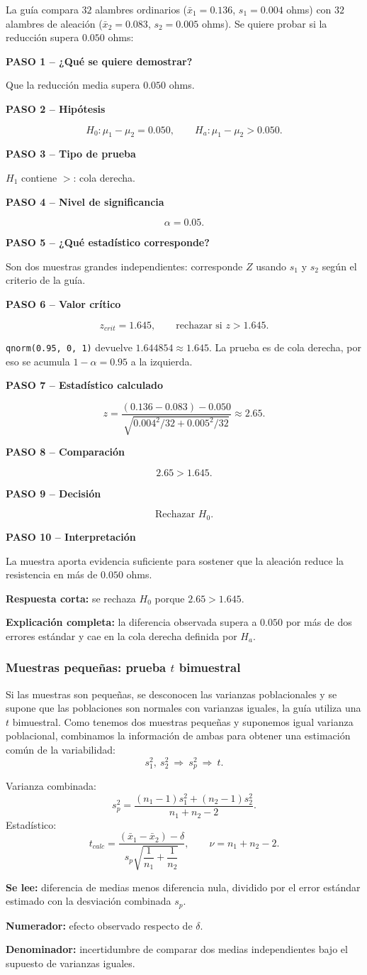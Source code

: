 \documentclass[11pt,a4paper]{article}
\newcommand{\paso}[2]{\par\medskip\noindent\textbf{PASO #1 -- #2}\par}
\begin{document}
La guía compara $32$ alambres ordinarios ($\bar{x}_1=0.136$, $s_1=0.004$ ohms) con $32$ alambres de aleación ($\bar{x}_2=0.083$, $s_2=0.005$ ohms). Se quiere probar si la reducción supera $0.050$ ohms:
\paso{1}{¿Qué se quiere demostrar?} Que la reducción media supera $0.050$ ohms.
\paso{2}{Hipótesis}
\[
H_0:\mu_1-\mu_2=0.050,
\qquad
H_a:\mu_1-\mu_2>0.050.
\]
\paso{3}{Tipo de prueba} $H_1$ contiene $>$: cola derecha.
\paso{4}{Nivel de significancia} \[\alpha=0.05.\]
\paso{5}{¿Qué estadístico corresponde?} Son dos muestras grandes independientes: corresponde $Z$ usando $s_1$ y $s_2$ según el criterio de la guía.
\paso{6}{Valor crítico} \[z_{crit}=1.645,\qquad \text{rechazar si }z>1.645.\]
\begin{calculor}
\texttt{qnorm(0.95, 0, 1)} devuelve $1.644854\approx1.645$. La prueba es de cola derecha, por eso se acumula $1-\alpha=0.95$ a la izquierda.
\end{calculor}
\paso{7}{Estadístico calculado}
\[
z=\frac{(0.136-0.083)-0.050}
{\sqrt{0.004^2/32+0.005^2/32}}\approx2.65.
\]
\paso{8}{Comparación} \[2.65>1.645.\]
\paso{9}{Decisión} \[\boxed{\text{Rechazar }H_0}.\]
\paso{10}{Interpretación} La muestra aporta evidencia suficiente para sostener que la aleación reduce la resistencia en más de $0.050$ ohms.

\begin{preguntaoral}
\textbf{Respuesta corta:} se rechaza $H_0$ porque $2.65>1.645$.\par
\textbf{Explicación completa:} la diferencia observada supera a $0.050$ por más de dos errores estándar y cae en la cola derecha definida por $H_a$.
\end{preguntaoral}

\subsubsection{\texorpdfstring{Muestras pequeñas: prueba $t$ bimuestral}{Muestras pequeñas: prueba t bimuestral}}

Si las muestras son pequeñas, se desconocen las varianzas poblacionales y se supone que las poblaciones son normales con varianzas iguales, la guía utiliza una $t$ bimuestral. Como tenemos dos muestras pequeñas y suponemos igual varianza poblacional, combinamos la información de ambas para obtener una estimación común de la variabilidad:
\[
s_1^2,\ s_2^2\ \Longrightarrow\ s_p^2\ \Longrightarrow\ t.
\]

Varianza combinada:
\[
 s_p^2=\frac{(n_1-1)s_1^2+(n_2-1)s_2^2}{n_1+n_2-2}.
\]
Estadístico:
\[
 t_{calc}=\frac{(\bar{x}_1-\bar{x}_2)-\delta}
 {s_p\sqrt{\dfrac1{n_1}+\dfrac1{n_2}}},
 \qquad \nu=n_1+n_2-2.
\]
\begin{leerformula}
\textbf{Se lee:} diferencia de medias menos diferencia nula, dividido por el error estándar estimado con la desviación combinada $s_p$.\par
\textbf{Numerador:} efecto observado respecto de $\delta$.\par
\textbf{Denominador:} incertidumbre de comparar dos medias independientes bajo el supuesto de varianzas iguales.
\end{leerformula}
\end{document}
